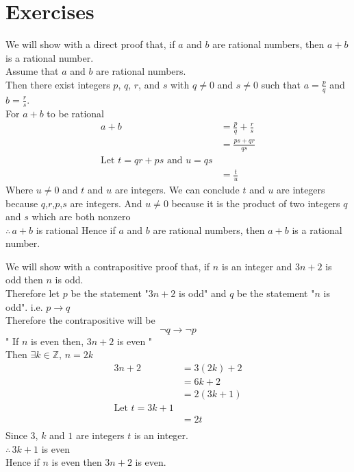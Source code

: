 \documentclass[12pt letter]{report}
\begin{document}
\section{Exercises}



\begin{myproof}
	We will show with a direct proof that, if $a$ and $b$ are rational numbers, then $a + b$ is a rational number. \\
	Assume that $a$ and $b$ are rational numbers. \\
	Then there exist integers $p$, $q$, $r$, and $s$ with $q \neq 0$ and $s \neq 0$ such that $a = \frac{p}{q}$ and $b =
		\frac{r}{s}$.\\
	For $a + b$ to be rational
	\begin{align*}
		a + b & = \frac{p}{q} + \frac{r}{s}  \\
		      & = \frac{ps + qr}{qs}         \\
		\text{Let $t =qr + ps$ and $u = qs$} \\
		      & = \frac{t}{u}
	\end{align*}
	Where $u \neq 0$ and $t$ and $u$ are integers. We can conclude $t$ and $u$ are integers because $q$,$r$,$p$,$s$ are
	integers. And $u\neq 0$ because it is the product of two integers $q$ and $s$ which are both nonzero\\
	$\therefore \, a + b$ is rational
	Hence if $a$ and $b$ are rational numbers, then $a + b$ is a rational number.
\end{myproof}


\begin{myproof}
	We will show with a contrapositive proof that, if $n$ is an integer and $3n + 2$ is odd then $n$ is odd. \\
	Therefore let $p$ be the statement "$3n + 2$ is odd" and $q$ be the statement "$n$ is odd". i.e. $p \to q$ \\
	Therefore the contrapositive will be
	\[
		\neg q \to \neg p
	\]
	" If $n$ is even then, $3n + 2$ is even "\\
	Then $\exists k \in \mathbb{Z},\, n = 2k$
	\begin{align*}
		3n + 2 & = 3 \left( 2k \right)  + 2 \\
		       & = 6k + 2                   \\
		       & = 2 \left( 3k + 1 \right)  \\
		\text{Let } t = 3k + 1              \\
		       & = 2t                       \\
	\end{align*}
	Since $3$, $k$ and $1$ are integers $t$ is an integer.\\
	$\therefore \, 3k + 1$ is even \\
	Hence if $n$ is even then $3n + 2$ is even. \\
\end{myproof}
\end{document}
